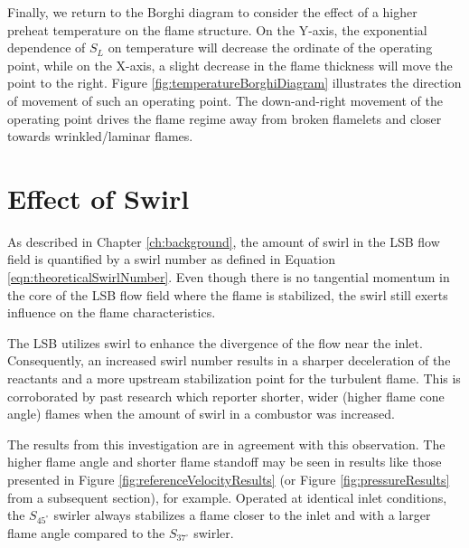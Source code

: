 Finally, we return to the Borghi diagram to consider the effect of a higher preheat temperature on the flame structure.
On the Y-axis, the exponential dependence of \(S_L\) on temperature will decrease the ordinate of the operating point, while on the X-axis, a slight decrease in the flame thickness will move the point to the right.
Figure \ref{fig:temperatureBorghiDiagram} illustrates the direction of movement of such an operating point.
The down-and-right movement of the operating point drives the flame regime away from broken flamelets and closer towards wrinkled/laminar flames.



\section{Effect of Swirl}
\label{sec:lsb-effect-of-swirl}

As described in Chapter \ref{ch:background}, the amount of swirl in the LSB flow field is quantified by a swirl number as defined in Equation \ref{eqn:theoreticalSwirlNumber}.
Even though there is no tangential momentum in the core of the LSB flow field where the flame is stabilized, the swirl still exerts influence on the flame characteristics.

The LSB utilizes swirl to enhance the divergence of the flow near the inlet.
Consequently, an increased swirl number results in a sharper deceleration of the reactants and a more upstream stabilization point for the turbulent flame.
This is corroborated by past research\cite{1986-starner,1992-chan} which reporter shorter, wider (higher flame cone angle) flames when the amount of swirl in a combustor was increased.

The results from this investigation are in agreement with this observation.
The higher flame angle and shorter flame standoff may be seen in results like those presented in Figure \ref{fig:referenceVelocityResults} (or Figure \ref{fig:pressureResults} from a subsequent section), for example.
Operated at identical inlet conditions, the \(S_{45^\circ}\) swirler always stabilizes a flame closer to the inlet and with a larger flame angle compared to the \(S_{37^\circ}\) swirler.

